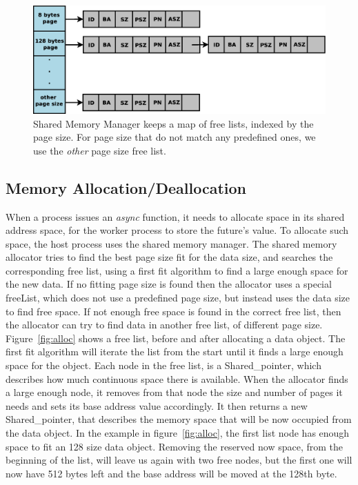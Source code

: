\begin{figure}[!ht]
\includegraphics[width=\columnwidth]{figures/free_lists}
\caption{Shared Memory Manager keeps a map of free lists, indexed by the page size.  For page size that do
not match any predefined ones, we use the \emph{other} page size free list.}
\label{fig:freeLists}
\end{figure}

\subsection{Memory Allocation/Deallocation}
When a process issues an \emph{async} function, it needs to allocate space in its shared address space, for the worker process to store the future's value.  To allocate such space, the host process uses the shared memory manager. 
The shared memory allocator tries to find the best page size
fit for the data size, and searches the corresponding free list, using a first fit algorithm to find a large 
enough space for the new data. If no fitting page size is found then the allocator uses a special freeList, 
which does not use a predefined page size, but instead uses the data size to find free space.  If not enough free
space is found in the correct free list, then the allocator can try to find data in another free list, of different
page size.  Figure~\ref{fig:alloc} shows a free list, before and after allocating a data object.
The first fit algorithm
will iterate the list from the start until it finds a large enough space for the object.  Each node in the free list,
is a Shared\_pointer, which describes how much continuous space there is available.  When the allocator finds a large
enough node, it removes from that node the size and number of pages it needs and sets its base address value 
accordingly.
It then returns a new Shared\_pointer, that describes the memory space that will be now occupied from the data object.
In the example in figure~\ref{fig:alloc}, the first list node has enough space to fit an 128 size data object.  
Removing the reserved now space, from the beginning of the list, will leave us again with two free nodes, but the
first one will now have 512 bytes left and the base address will be moved at the 128th byte.


